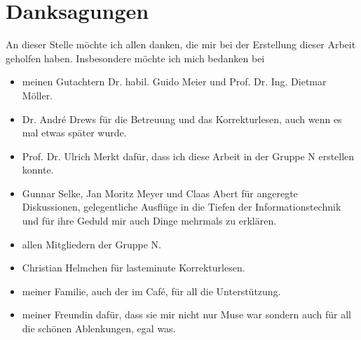 \clearpage
\chapter*{Danksagungen}
An dieser Stelle m\"ochte ich allen danken, die mir bei der Erstellung dieser Arbeit geholfen haben. Insbesondere m\"ochte ich mich bedanken bei
\begin{itemize}
\item meinen Gutachtern Dr. habil. Guido Meier und Prof. Dr. Ing. Dietmar M\"oller.
\item Dr. Andr\'e Drews f\"ur die Betreuung und das Korrekturlesen, auch wenn es mal etwas sp\"ater wurde.
\item Prof. Dr. Ulrich Merkt daf\"ur, dass ich diese Arbeit in der Gruppe N erstellen konnte.
\item Gunnar Selke, Jan Moritz Meyer und Claas Abert f\"ur angeregte Diskussionen, gelegentliche Ausfl\"uge in die Tiefen der Informationstechnik und f\"ur ihre Geduld mir auch Dinge mehrmals zu erkl\"aren.
\item allen Mitgliedern der Gruppe N.
\item Christian Helmchen f\"ur lasteminute Korrekturlesen.
\item meiner Familie, auch der im Caf\'e, f\"ur all die Unterst\"utzung.
\item meiner Freundin daf\"ur, dass sie mir nicht nur Muse war sondern auch f\"ur all die sch\"onen Ablenkungen, egal was.
\end{itemize}
